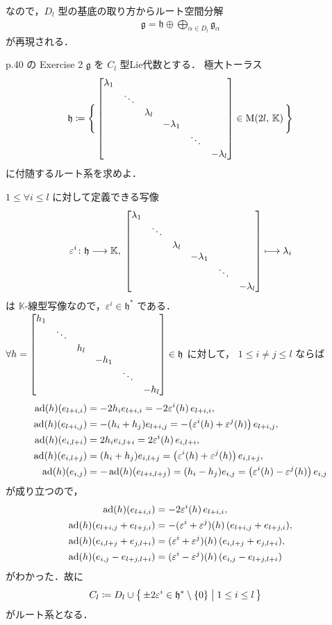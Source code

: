 \documentclass{ltjsarticle}
\theoremstyle{mystyle} %
\numberwithin{equation}{section}
\newcommand{\lto}{\longrightarrow}
\newcommand{\lmto}{\longmapsto}
\begin{document}
なので，$D_l$ 型の基底の取り方からルート空間分解
\begin{align}
    \mathfrak{g} = \mathfrak{h} \oplus \bigoplus_{\alpha \in D_l} \mathfrak{g}_{\alpha}
\end{align}
が再現される．

\begin{myproblem}[label=ex:2-8-2C]{p.40 の Exercise 2}
    $\mathfrak{g}$ を $C_l$ 型Lie代数とする．
    極大トーラス
    \begin{align}
        \mathfrak{h} \coloneqq \Biggl\{\, \mqty[\dmat{\lambda_1,\ddots,\lambda_{l},-\lambda_{1},\ddots,-\lambda_{l}}] \in \Mat{2l}{\mathbb{K}} \,\Biggr\} 
    \end{align}
    に付随するルート系を求めよ．
\end{myproblem}


$1 \le \forall i \le l$ に対して定義できる写像
\begin{align}
    \varepsilon^i \colon \mathfrak{h} \lto \mathbb{K},\; \mqty[\dmat{\lambda_1,\ddots,\lambda_{l},-\lambda_{1},\ddots,-\lambda_{l}}] \lmto \lambda_i
\end{align}
は $\mathbb{K}$-線型写像なので，$\varepsilon^i \in \mathfrak{h}^*$ である．
$\forall h = \mqty[\dmat{h_1,\ddots,h_{l},-h_{1},\ddots,-h_{l}}] \in \mathfrak{h}$ に対して，
$1 \le i \neq j \le l$ ならば
\begin{align}
    \operatorname{ad}(h)(e_{l+i,i}) &= -2h_i e_{l+i,i} = -2\varepsilon^i(h)\, e_{l+i,i}, \\
    \operatorname{ad}(h)(e_{l+i,j}) &= -(h_i + h_j) e_{l+i,j} = - \bigl( \varepsilon^i(h) + \varepsilon^j(h) \bigr)\, e_{l+i,j} , \\
    \operatorname{ad}(h)(e_{i,l+i}) &= 2h_i e_{i,l+i} = 2\varepsilon^i(h)\, e_{i,l+i}, \\
    \operatorname{ad}(h)(e_{i,l+j}) &= (h_i + h_j) e_{i,l+j} = \bigl( \varepsilon^i(h) + \varepsilon^j(h) \bigr)\, e_{i,l+j}, \\
    \operatorname{ad}(h)(e_{i,j}) &= - \operatorname{ad}(h)(e_{l+i,l+j}) = (h_i - h_j) e_{i,j} = \bigl( \varepsilon^i(h) - \varepsilon^j(h) \bigr)\, e_{i,j}
\end{align}
が成り立つので，
\begin{align}
    \operatorname{ad}(h)(e_{l+i,i}) &= -2\varepsilon^i(h)\, e_{l+i,i}, \\
    \operatorname{ad}(h)(e_{l+i,j} + e_{l+j,i}) &= -(\varepsilon^i + \varepsilon^j)(h)\, (e_{l+i,j} + e_{l+j,i}), \\
    \operatorname{ad}(h)(e_{i,l+j} + e_{j,l+i}) &= (\varepsilon^i + \varepsilon^j)(h)\, (e_{i,l+j} + e_{j,l+i}), \\
    \operatorname{ad}(h)(e_{i,j} - e_{l+j,l+i}) &= (\varepsilon^i - \varepsilon^j)(h)\, (e_{i,j} - e_{l+j,l+i})
\end{align}
がわかった．故に
\begin{align}
    C_l
    &\coloneqq D_l \cup \bigl\{\, \pm 2\varepsilon^i \in \mathfrak{h}^* \setminus \{0\}\bigm| 1 \le i \le l \,\bigr\}
\end{align}
がルート系となる．
\end{document}
